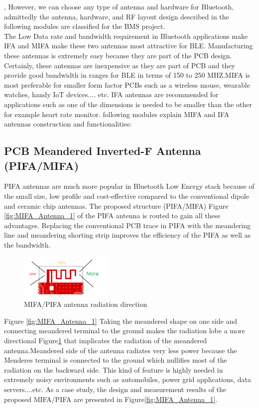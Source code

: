 \indent, However, we can choose any type of antenna and hardware for Bluetooth, admittedly the antenna, hardware, and RF layout design described in the following modules are classified for the BMS project.\\
\indent The Low Data rate and bandwidth requirement in Bluetooth applications make IFA and MIFA make these two antennas most attractive for BLE.  Manufacturing these antennas is extremely easy because they are part of the PCB design. Certainly, these antennas are inexpensive as they are part of PCB and they provide good bandwidth in ranges for BLE in terms of 150 to 250 MHZ.MIFA is most preferable for smaller form factor PCBs such as a wireless mouse, wearable watches, handy IoT devices.... etc. IFA antennas are recommended for applications such as one of the dimensions is needed to be smaller than the other for example heart rate monitor.
following modules explain MIFA and IFA antennas construction and functionalities:

\subsection{PCB Meandered Inverted-F Antenna (PIFA/MIFA)}

PIFA antennas are much more popular in Bluetooth Low Energy stack because of the small size, low profile and cost-effective compared to the conventional dipole and ceramic chip antennas.
The proposed structure (PIFA/MIFA) Figure \ref{fig:MIFA_Antenna_1} of the PIFA antenna is routed to gain all these advantages.
Replacing the conventional PCB trace in PIFA with the meandering line and meandering shorting strip
improves the efficiency of the PIFA as well as the bandwidth. 
\begin{figure}[h]
	\centering
	\includegraphics[width=0.4\textwidth]{Chap03/Figures/MIFA_Antenna_radiation_direction.PNG}
	\caption{MIFA/PIFA antenna radiation direction}
	\label{fig:MIFA_RADIATION_DIRECTION}
\end{figure}

Figure \ref{fig:MIFA_Antenna_1} Taking the meandered shape on one side and connecting meandered terminal to the ground makes the radiation lobe a more directional Figure\ref{fig:MIFA_RADIATION_DIRECTION} that implicates the radiation of the meandered antenna.Meandered side of the antenna radiates very less power because the Menderes terminal is connected to the ground which nullifies most of the radiation on the backward side. This kind of feature is highly needed in extremely noisy environments such as automobiles, power grid applications, data servers....etc.
As a case study, the design and measurement results of the
proposed MIFA/PIFA are presented \cite{PIFA2017Cheuk} in Figure\ref{fig:MIFA_Antenna_1}.


